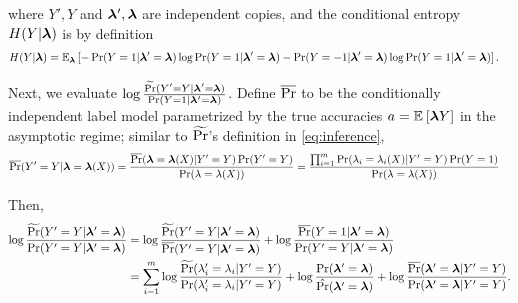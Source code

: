 where $Y', Y$ and $\bm{\lambda}', \bm{\lambda}$ are independent copies, and the conditional entropy $H(Y | \bm{\lambda})$ is by definition
\begin{align}
    H(Y | \bm{\lambda}) &= \mathbb{E}_{\bm{\lambda}}\left[- \Pr(Y = 1 | \bm{\lambda}' = \bm{\lambda}) \log \Pr(Y = 1 | \bm{\lambda}' = \bm{\lambda}) - \Pr(Y = -1 | \bm{\lambda}' = \bm{\lambda}) \log \Pr(Y = 1 | \bm{\lambda}' = \bm{\lambda})\right].
\end{align}

Next, we evaluate $ \log \frac{\widetilde{\Pr}(Y' = Y | \bm{\lambda}' = \bm{\lambda})}{\Pr(Y = 1 | \bm{\lambda}' = \bm{\lambda})}$. Define $\overline{\Pr}$ to be the conditionally independent label model parametrized by the true accuracies $a = \mathbb{E}_{}\left[\bm{\lambda} Y\right]$ in the asymptotic regime; similar to $\widetilde{\Pr}$'s definition in \eqref{eq:inference}, 
\begin{align}
    \overline{\Pr}(Y' = Y | \bm{\lambda} =  \bm{\lambda}(X)) &= \frac{\overline{\Pr}(\bm{\lambda} = \bm{\lambda}(X) | Y' = Y) \Pr(Y' = Y)}{\Pr(\lambda = \lambda(X))} = \frac{\prod_{i = 1}^m \Pr(\lambda_i = \lambda_i(X) | Y' = Y) \Pr(Y = 1)}{\Pr(\lambda = \lambda(X))}
\end{align}

Then, 
\begin{align*}
 \log \frac{\widetilde{\Pr}(Y' = Y | \bm{\lambda}' = \bm{\lambda})}{\Pr(Y' = Y | \bm{\lambda}' = \bm{\lambda})} &= \log \frac{\widetilde{\Pr}(Y' = Y | \bm{\lambda}' = \bm{\lambda})}{\overline{\Pr}(Y' = Y | \bm{\lambda}' = \bm{\lambda})} + \log \frac{\overline{\Pr}(Y = 1 | \bm{\lambda}' = \bm{\lambda})}{\Pr(Y' = Y | \bm{\lambda}' = \bm{\lambda})} \\
&= \sum_{i = 1}^m \log \frac{\widetilde{\Pr}(\lambda'_i = \lambda_i | Y' = Y)}{\Pr( \lambda'_i = \lambda_i | Y' = Y)} + \log \frac{\Pr(\bm{\lambda}' = \bm{\lambda})}{\hat{\Pr}(\bm{\lambda}' = \bm{\lambda})} + \log \frac{\overline{\Pr}(\bm{\lambda}' = \bm{\lambda} | Y' = Y)}{\Pr(\bm{\lambda}' = \bm{\lambda} | Y' = Y)}.
\end{align*}

